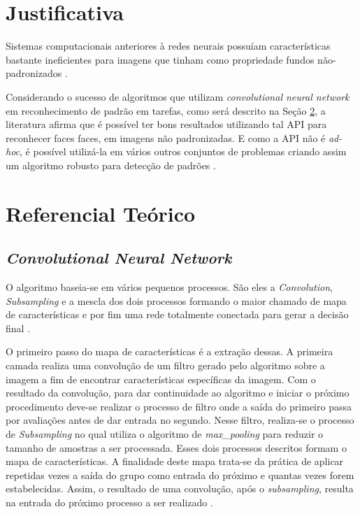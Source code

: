 \documentclass[10pt, conference]{IEEEtran}
\begin{document}
\section{Justificativa} \label{sec:justificativa}
	Sistemas computacionais anteriores à redes neurais possuíam características bastante ineficientes para imagens que tinham como propriedade fundos não-padronizados \cite{Garcia2004}.

	Considerando o sucesso de algoritmos que utilizam \textit{convolutional neural network} em reconhecimento de padrão em tarefas, como será descrito na Seção \ref{sec:rt}, a literatura afirma que é possível ter bons resultados utilizando tal API para reconhecer faces faces, em imagens não padronizadas. E como a API não é \textit{ad-hoc}, é possível utilizá-la em vários outros conjuntos de problemas criando assim um algoritmo robusto para detecção de padrões \cite{Haoxiang2015}.

\section{Referencial Teórico} \label{sec:rt}
	\subsection{\textit{Convolutional Neural Network}}
		O algoritmo baseia-se em vários pequenos processos. São eles a \textit{Convolution}, \textit{Subsampling} e a mescla dos dois processos formando o maior chamado de mapa de características e por fim uma rede totalmente conectada para gerar a decisão final \cite{Garcia2004}.

		O primeiro passo do mapa de características é a extração dessas. A primeira camada realiza uma convolução de um filtro gerado pelo algoritmo sobre a imagem a fim de encontrar características específicas da imagem. Com o resultado da convolução, para dar continuidade ao algoritmo e iniciar o próximo procedimento deve-se realizar o processo de filtro onde a saída do primeiro passa por avaliações antes de dar entrada no segundo. Nesse filtro, realiza-se o processo de \textit{Subsampling} no qual utiliza o algoritmo de \textit{max\_pooling} para reduzir o tamanho de amostras a ser processada. Esses dois processos descritos formam o mapa de características. A finalidade deste mapa trata-se da prática de aplicar repetidas vezes a saída do grupo como entrada do próximo e quantas vezes forem estabelecidas. Assim, o resultado de uma convolução, após o \textit{subsampling}, resulta na entrada do próximo processo a ser realizado \cite{Garcia2004} \cite{Giusti2013}. 
\end{document}
